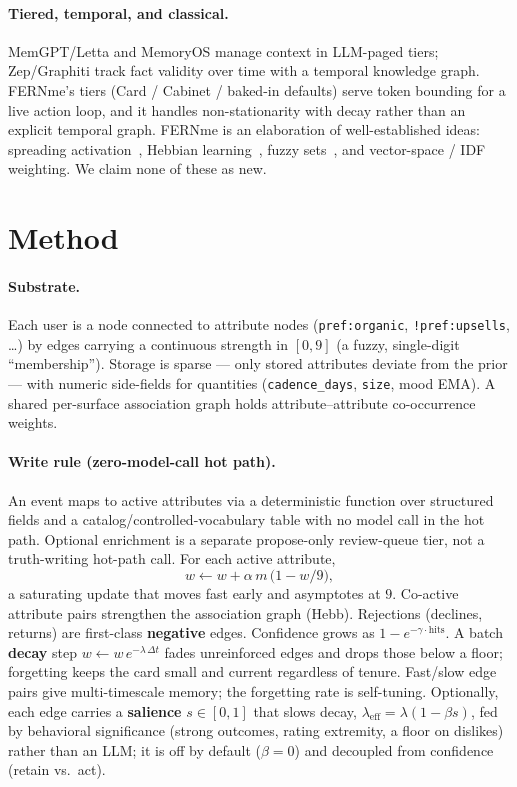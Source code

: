 \documentclass[11pt]{article}
\begin{document}
\paragraph{Tiered, temporal, and classical.} MemGPT/Letta and MemoryOS manage context in
LLM-paged tiers; Zep/Graphiti track fact validity over time with a temporal knowledge
graph. FERNme's tiers (Card / Cabinet / baked-in defaults) serve token bounding for a
live action loop, and it handles non-stationarity with decay rather than an explicit
temporal graph. FERNme is an elaboration of well-established ideas: spreading
activation~\cite{collins1975spreading,anderson2004actr}, Hebbian learning~\cite{hebb1949},
fuzzy sets~\cite{zadeh1965}, and vector-space / IDF weighting. We claim none of these as
new.

\section{Method}
\paragraph{Substrate.} Each user is a node connected to attribute nodes
(\texttt{pref:organic}, \texttt{!pref:upsells}, \dots) by edges carrying a continuous
strength in $[0,9]$ (a fuzzy, single-digit ``membership''). Storage is sparse --- only
stored attributes deviate from the prior --- with numeric side-fields for quantities
(\texttt{cadence\_days}, \texttt{size}, mood EMA). A shared per-surface association graph
holds attribute--attribute co-occurrence weights.

\paragraph{Write rule (zero-model-call hot path).} An event maps to active attributes via a
deterministic function over structured fields and a catalog/controlled-vocabulary table
with no model call in the hot path. Optional enrichment is a separate propose-only
review-queue tier, not a truth-writing hot-path call. For each active attribute,
\[
w \leftarrow w + \alpha\, m\,\bigl(1 - w/9\bigr),
\]
a saturating update that moves fast early and asymptotes at $9$. Co-active attribute
pairs strengthen the association graph (Hebb). Rejections (declines, returns) are
first-class \textbf{negative} edges. Confidence grows as $1 - e^{-\gamma\cdot \mathrm{hits}}$.
A batch \textbf{decay} step $w \leftarrow w\, e^{-\lambda\,\Delta t}$ fades unreinforced
edges and drops those below a floor; forgetting keeps the card small and current
regardless of tenure. Fast/slow edge pairs give multi-timescale memory; the forgetting
rate is self-tuning. Optionally, each edge carries a \textbf{salience} $s\in[0,1]$ that
slows decay, $\lambda_\mathrm{eff}=\lambda(1-\beta s)$, fed by behavioral significance
(strong outcomes, rating extremity, a floor on dislikes) rather than an LLM; it is off by
default ($\beta=0$) and decoupled from confidence (retain vs.\ act).
\end{document}
